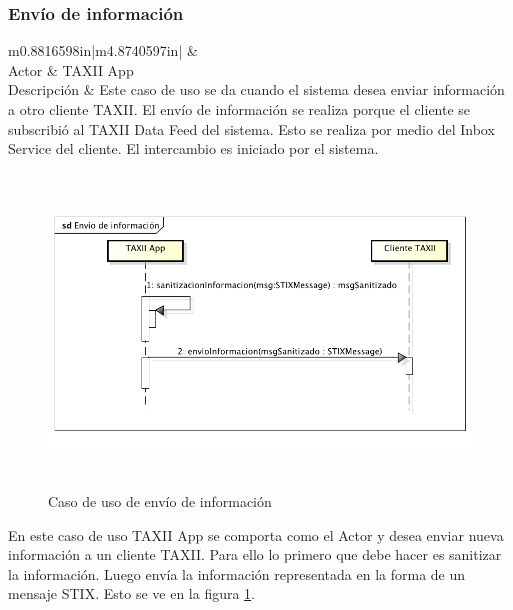 \subsubsection{Envío de información}
\begin{flushleft}
	\tablefirsthead{}
	\tablehead{}
	\tabletail{}
	\tablelasttail{}
	\begin{supertabular}{m{0.8816598in}|m{4.8740597in}|}
		 &
		\\\hline
		{ Actor} &
		{ TAXII App}\\
		{ Descripción} &
		{ Este caso de uso se da cuando el sistema desea enviar información a otro cliente
			TAXII. El envío de información se realiza porque el cliente se subscribió al TAXII Data Feed del sistema. Esto se
			realiza por medio del Inbox Service del cliente. El intercambio es iniciado por el sistema.}\\\hhline{~-}
	\end{supertabular}
\end{flushleft}
\begin{figure}[ht!]
	\centering  \includegraphics[width=5.7638in,height=3.2764in]{Analisis22-img/Analisis22-img029.png}
	\caption{Caso de uso de envío de información}
	\label{fig.enviodeinfo}
\end{figure}

{
	En este caso de uso TAXII App se comporta como el Actor y desea enviar nueva información a un cliente TAXII. Para ello
	lo primero que debe hacer es sanitizar la información. Luego envía la información representada en la forma de un
	mensaje STIX. Esto se ve en la figura \ref{fig.enviodeinfo}.}
\newpage
